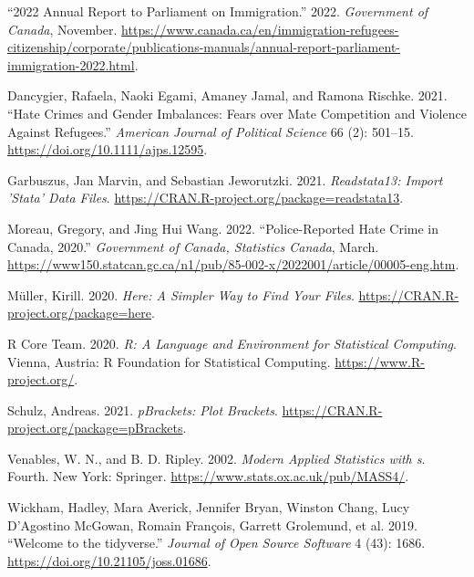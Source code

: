 \documentclass[
]{article}
\newlength{\cslhangindent}
\newlength{\cslentryspacingunit} %
\newenvironment{CSLReferences}[2] %
 {%
  \setlength{\parindent}{0pt}
  \ifodd #1
  \let\oldpar\par
  \def\par{\hangindent=\cslhangindent\oldpar}
  \fi
  \setlength{\parskip}{#2\cslentryspacingunit}
 }%
 {}
\begin{document}
\hypertarget{refs}{}
\begin{CSLReferences}{1}{0}
\leavevmode{}%
{``2022 Annual Report to Parliament on Immigration.''} 2022.
\emph{Government of Canada}, November.
\url{https://www.canada.ca/en/immigration-refugees-citizenship/corporate/publications-manuals/annual-report-parliament-immigration-2022.html}.

\leavevmode{}%
Dancygier, Rafaela, Naoki Egami, Amaney Jamal, and Ramona Rischke. 2021.
{``Hate Crimes and Gender Imbalances: Fears over Mate Competition and
Violence Against Refugees.''} \emph{American Journal of Political
Science} 66 (2): 501--15. \url{https://doi.org/10.1111/ajps.12595}.

\leavevmode{}%
Garbuszus, Jan Marvin, and Sebastian Jeworutzki. 2021.
\emph{Readstata13: Import 'Stata' Data Files}.
\url{https://CRAN.R-project.org/package=readstata13}.

\leavevmode{}%
Moreau, Gregory, and Jing Hui Wang. 2022. {``Police-Reported Hate Crime
in Canada, 2020.''} \emph{Government of Canada, Statistics Canada},
March.
\url{https://www150.statcan.gc.ca/n1/pub/85-002-x/2022001/article/00005-eng.htm}.

\leavevmode{}%
Müller, Kirill. 2020. \emph{Here: A Simpler Way to Find Your Files}.
\url{https://CRAN.R-project.org/package=here}.

\leavevmode{}%
R Core Team. 2020. \emph{R: A Language and Environment for Statistical
Computing}. Vienna, Austria: R Foundation for Statistical Computing.
\url{https://www.R-project.org/}.

\leavevmode{}%
Schulz, Andreas. 2021. \emph{pBrackets: Plot Brackets}.
\url{https://CRAN.R-project.org/package=pBrackets}.

\leavevmode{}%
Venables, W. N., and B. D. Ripley. 2002. \emph{Modern Applied Statistics
with s}. Fourth. New York: Springer.
\url{https://www.stats.ox.ac.uk/pub/MASS4/}.

\leavevmode{}%
Wickham, Hadley, Mara Averick, Jennifer Bryan, Winston Chang, Lucy
D'Agostino McGowan, Romain François, Garrett Grolemund, et al. 2019.
{``Welcome to the {tidyverse}.''} \emph{Journal of Open Source Software}
4 (43): 1686. \url{https://doi.org/10.21105/joss.01686}.


\end{CSLReferences}
\end{document}
